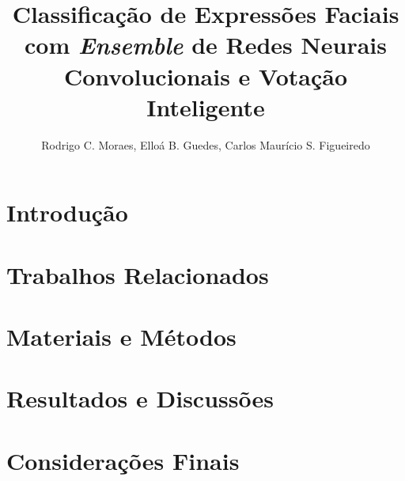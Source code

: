 \documentclass[12pt]{article}
\title{Classificação de Expressões Faciais com \emph{Ensemble} de Redes Neurais Convolucionais e Votação Inteligente}
\author{Rodrigo C. Moraes, Elloá B. Guedes, Carlos Maurício S. Figueiredo}
\begin{document}
\maketitle




\section{Introdução}


\section{Trabalhos Relacionados}


\section{Materiais e Métodos}


\section{Resultados e Discussões}


\section{Considerações Finais}




\end{document}
